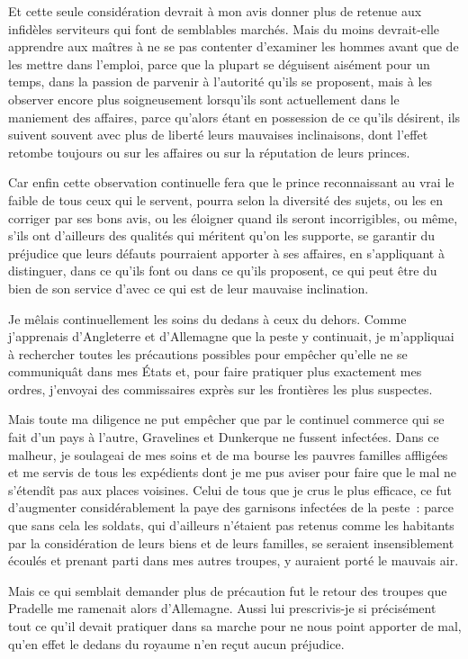 \documentclass[french,twoside]{book} %
\begin{document}
Et cette seule considération devrait à mon avis donner plus de retenue aux infidèles serviteurs qui font de semblables marchés. Mais du moins devrait-elle apprendre aux maîtres à ne se pas contenter d’examiner les hommes avant que de les mettre dans l’emploi, parce que la plupart se déguisent aisément pour un temps, dans la passion de parvenir à l’autorité qu’ils se proposent, mais à les observer encore plus soigneusement lorsqu’ils sont actuellement dans le maniement des affaires, parce qu’alors étant en possession de ce qu’ils désirent, ils suivent souvent avec plus de liberté leurs mauvaises inclinaisons, dont l’effet retombe toujours ou sur les affaires ou sur la réputation de leurs princes.\par
Car enfin cette observation continuelle fera que le prince reconnaissant au vrai le faible de tous ceux qui le servent, pourra selon la diversité des sujets, ou les en corriger par ses bons avis, ou les éloigner quand ils seront incorrigibles, ou même, s’ils ont d’ailleurs des qualités qui méritent qu’on les supporte, se garantir du préjudice que leurs défauts pourraient apporter à ses affaires, en s’appliquant à distinguer, dans ce qu’ils font ou dans ce qu’ils proposent, ce qui peut être du bien de son service d’avec ce qui est de leur mauvaise inclination.\par
Je mêlais continuellement les soins du dedans à ceux du dehors. Comme j’apprenais d’Angleterre et d’Allemagne que la peste y continuait, je m’appliquai à rechercher toutes les précautions possibles pour empêcher qu’elle ne se communiquât dans mes États et, pour faire pratiquer plus exactement mes ordres, j’envoyai des commissaires exprès sur les frontières les plus suspectes.\par
Mais toute ma diligence ne put empêcher que par le continuel commerce qui se fait d’un pays à l’autre, Gravelines et Dunkerque ne fussent infectées. Dans ce malheur, je soulageai de mes soins et de ma bourse les pauvres familles affligées et me servis de tous les expédients dont je me pus aviser pour faire que le mal ne s’étendît pas aux places voisines. Celui de tous que je crus le plus efficace, ce fut d’augmenter considérablement la paye des garnisons infectées de la peste : parce que sans cela les soldats, qui d’ailleurs n’étaient pas retenus comme les habitants par la considération de leurs biens et de leurs familles, se seraient insensiblement écoulés et prenant parti dans mes autres troupes, y auraient porté le mauvais air.\par
Mais ce qui semblait demander plus de précaution fut le retour des troupes que Pradelle me ramenait alors d’Allemagne. Aussi lui prescrivis-je si précisément tout ce qu’il devait pratiquer dans sa marche pour ne nous point apporter de mal, qu’en effet le dedans du royaume n’en reçut aucun préjudice.\par
\end{document}
